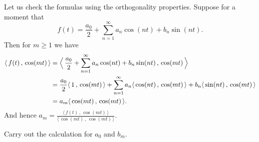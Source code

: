 Let us check the formulas using the orthogonality properties.  Suppose for
a moment that
\begin{equation*}
f(t) = \frac{a_0}{2} + \sum_{n=1}^\infty a_n \cos (n t) + b_n
\sin (n t) .
\end{equation*}
Then for $m \geq 1$ we have
\begin{equation*}
\begin{split}
\langle \, f(t)\,,\,\cos (mt) \, \rangle
& =
\Bigl\langle \, \frac{a_0}{2} + \sum_{n=1}^\infty a_n \cos (n t) + b_n
\sin (n t) \,,\, \cos (mt) \, \Bigr\rangle \\
& =
\frac{a_0}{2}
\langle \, 1 \, , \, \cos (mt) \, \rangle
+ \sum_{n=1}^\infty
a_n \langle \, \cos (nt) \, , \, \cos (mt) \, \rangle +
b_n \langle \, \sin (n t) \, , \, \cos (mt) \, \rangle \\
& =
a_m \langle \, \cos (mt) \, , \, \cos (mt) \, \rangle .
\end{split}
\end{equation*}
And hence
$a_m =
\frac{\langle \, f(t) \, , \, \cos (mt) \, \rangle}{\langle \, \cos (mt) \, , \,
\cos (mt) \, \rangle}$.

\begin{exercise}
Carry out the calculation for $a_0$ and $b_m$.
\end{exercise}

